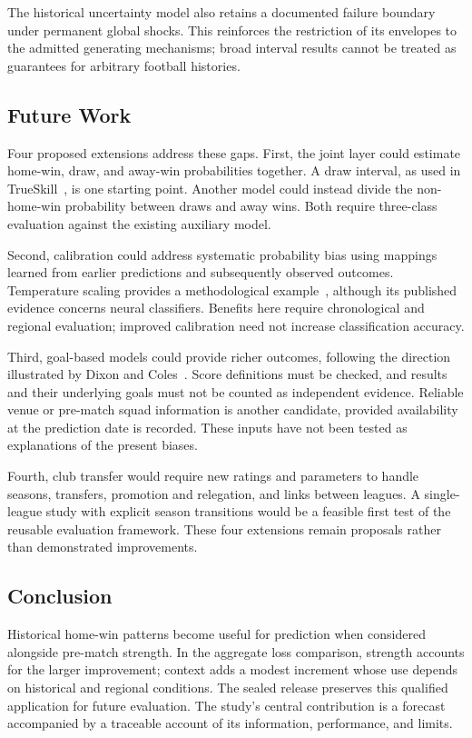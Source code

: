 The historical uncertainty model also retains a documented failure boundary under permanent global shocks. This reinforces the restriction of its envelopes to the admitted generating mechanisms; broad interval results cannot be treated as guarantees for arbitrary football histories.

\subsection{Future Work}

Four proposed extensions address these gaps. First, the joint layer could estimate home-win, draw, and away-win probabilities together. A draw interval, as used in TrueSkill~\citep{herbrich2006trueskill}, is one starting point. Another model could instead divide the non-home-win probability between draws and away wins. Both require three-class evaluation against the existing auxiliary model.

Second, calibration could address systematic probability bias using mappings learned from earlier predictions and subsequently observed outcomes. Temperature scaling provides a methodological example~\citep{guo2017calibration}, although its published evidence concerns neural classifiers. Benefits here require chronological and regional evaluation; improved calibration need not increase classification accuracy.

Third, goal-based models could provide richer outcomes, following the direction illustrated by Dixon and Coles~\citep{dixon1997scores}. Score definitions must be checked, and results and their underlying goals must not be counted as independent evidence. Reliable venue or pre-match squad information is another candidate, provided availability at the prediction date is recorded. These inputs have not been tested as explanations of the present biases.

Fourth, club transfer would require new ratings and parameters to handle seasons, transfers, promotion and relegation, and links between leagues. A single-league study with explicit season transitions would be a feasible first test of the reusable evaluation framework. These four extensions remain proposals rather than demonstrated improvements.

\subsection{Conclusion}

Historical home-win patterns become useful for prediction when considered alongside pre-match strength. In the aggregate loss comparison, strength accounts for the larger improvement; context adds a modest increment whose use depends on historical and regional conditions. The sealed release preserves this qualified application for future evaluation. The study's central contribution is a forecast accompanied by a traceable account of its information, performance, and limits.

